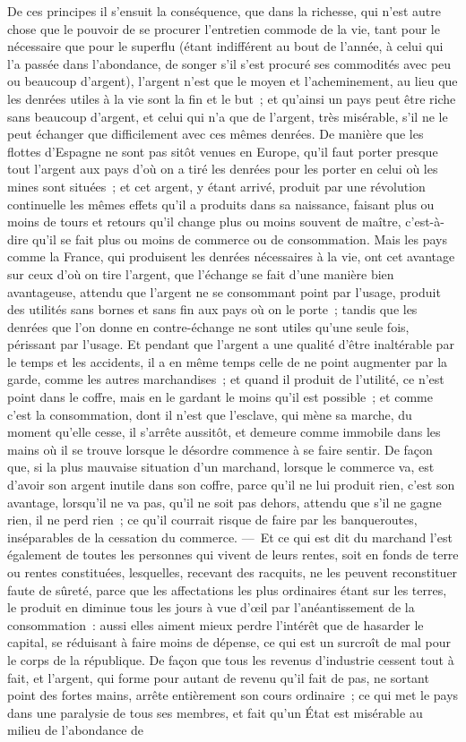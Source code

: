 \documentclass[french,twoside]{book} %
\begin{document}
De ces principes il s’ensuit la conséquence, que dans la richesse, qui n’est autre chose que le pouvoir de se procurer l’entretien commode de la vie, tant pour le nécessaire que pour le superflu (étant indifférent au bout de l’année, à celui qui l’a passée dans l’abondance, de songer s’il s’est procuré ses commodités avec peu ou beaucoup d’argent), l’argent n’est que le moyen et l’acheminement, au lieu que les denrées utiles à la vie sont la fin et le but ; et qu’ainsi un pays peut être riche sans beaucoup d’argent, et celui qui n’a que de l’argent, très misérable, s’il ne le peut échanger que difficilement avec ces mêmes denrées. De manière que les flottes d’Espagne ne sont pas sitôt venues en Europe, qu’il faut porter presque tout l’argent aux pays d’où on a tiré les denrées pour les porter en celui où les mines sont situées ; et cet argent, y étant arrivé, produit par une révolution continuelle les mêmes effets qu’il a produits dans sa naissance, faisant plus ou moins de tours et retours qu’il change plus ou moins souvent de maître, c’est-à-dire qu’il se fait plus ou moins de commerce ou de consommation. Mais les pays comme la France, qui produisent les denrées nécessaires à la vie, ont cet avantage sur ceux d’où on tire l’argent, que l’échange se fait d’une manière bien avantageuse, attendu que l’argent ne se consommant point par l’usage, produit des utilités sans bornes et sans fin aux pays où on le porte ; tandis que les denrées que l’on donne en contre-échange ne sont utiles qu’une seule fois, périssant par l’usage. Et pendant que l’argent a une qualité d’être inaltérable par le temps et les accidents, il a en même temps celle de ne point augmenter par la garde, comme les autres marchandises ; et quand il produit de l’utilité, ce n’est point dans le coffre, mais en le gardant le moins qu’il est possible ; et comme c’est la consommation, dont il n’est que l’esclave, qui mène sa marche, du moment qu’elle cesse, il s’arrête aussitôt, et demeure comme immobile dans les mains où il se trouve lorsque le désordre commence à se faire sentir. De façon que, si la plus mauvaise situation d’un marchand, lorsque le commerce va, est d’avoir son argent inutile dans son coffre, parce qu’il ne lui produit rien, c’est son avantage, lorsqu’il ne va pas, qu’il ne soit pas dehors, attendu que s’il ne gagne rien, il ne perd rien ; ce qu’il courrait risque de faire par les banqueroutes, inséparables de la cessation du commerce. — Et ce qui est dit du marchand l’est également de toutes les personnes qui vivent de leurs rentes, soit en fonds de terre ou rentes constituées, lesquelles, recevant des racquits, ne les peuvent reconstituer faute de sûreté, parce que les affectations les plus ordinaires étant sur les terres, le produit en diminue tous les jours à vue d’œil par l’anéantissement de la consommation : aussi elles aiment mieux perdre l’intérêt que de hasarder le capital, se réduisant à faire moins de dépense, ce qui est un surcroît de mal pour le corps de la république. De façon que tous les revenus d’industrie cessent tout à fait, et l’argent, qui forme pour autant de revenu qu’il fait de pas, ne sortant point des fortes mains, arrête entièrement son cours ordinaire ; ce qui met le pays dans une paralysie de tous ses membres, et fait qu’un État est misérable au milieu de l’abondance de 
\end{document}
